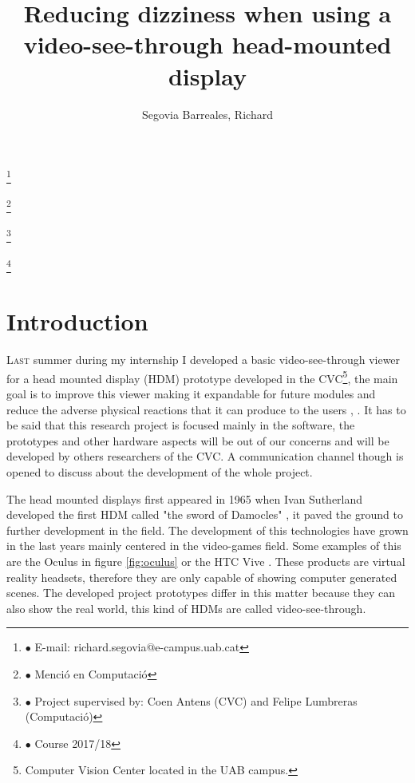 \documentclass[10pt,a4paper,twocolumn,twoside]{article}
\author{\LARGE\sffamily Segovia Barreales, Richard}
\title{\Huge{\sffamily Reducing dizziness when using a video-see-through head-mounted display}}
\date{}
\newcommand\blfootnote[1]{%
  \begingroup
  \renewcommand\thefootnote{}\footnote{#1}%
  \addtocounter{footnote}{-1}%
  \endgroup
}
\begin{document}
\fancyhead[RO]{\thepage}
\fancyhead[LE]{\thepage}

\fancyfoot[CO,CE]{}

{
   \fancyhf{}
}

\renewcommand{\headrulewidth}{0pt}
\renewcommand{\footrulewidth}{0pt}
\pagestyle{fancy}

\maketitle

\thispagestyle{primerapagina}


\blfootnote{$\bullet$ E-mail: richard.segovia@e-campus.uab.cat}
\blfootnote{$\bullet$ Menció en Computació}
\blfootnote{$\bullet$ Project supervised by: Coen Antens (CVC) and Felipe Lumbreras (Computació)}
\blfootnote{$\bullet$ Course 2017/18}

\section{Introduction}

\lettrine[lines=3]{L}{ast} summer during my internship I developed a basic video-see-through viewer for a head mounted display (HDM) prototype developed in the CVC\footnote{Computer Vision Center located in the UAB campus.}, the main goal is to improve this viewer making it expandable for future modules and reduce the adverse physical reactions that it can produce to the users \cite{disconfortReview}, \cite{unpublishCVC}. It has to be said that this research project is focused mainly in the software, the prototypes and other hardware aspects will be out of our concerns and will be developed by others researchers of the CVC. A communication channel though is opened to discuss about the development of the whole project.

The head mounted displays first appeared in 1965 when Ivan Sutherland developed the first HDM called "the sword of Damocles" \cite{hdmSutherland}, it paved the ground to further development in the field. The development of this technologies have grown in the last years mainly centered in the video-games field. Some examples of this are the Oculus \cite{web:oculus} in figure \ref{fig:oculus} or the HTC Vive \cite{web:vive}. These products are virtual reality headsets, therefore they are only capable of showing computer generated scenes. The developed project prototypes differ in this matter because they can also show the real world, this kind of HDMs are called video-see-through.
\end{document}
